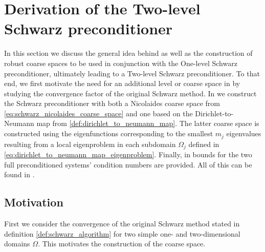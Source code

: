 \section{Derivation of the Two-level Schwarz preconditioner}\label{sec:schwarz_convergence}
In this section we discuss the general idea behind as well as the construction of robust coarse spaces to be used in conjunction with the One-level Schwarz preconditioner, ultimately leading to a Two-level Schwarz preconditioner. To that end, we first motivate the need for an additional level or coarse space in  by studying the convergence factor of the original Schwarz method. In  we construct the Schwarz preconditioner with both a Nicolaides coarse space from \cref{eq:schwarz_nicolaides_coarse_space} and one based on the Dirichlet-to-Neumann map from \cref{def:dirichlet_to_neumann_map}. The latter coarse space is constructed using the eigenfunctions corresponding to the smallest $m_j$ eigenvalues resulting from a local eigenproblem in each subdomain $\Omega_j$ defined in \cref{eq:dirichlet_to_neumann_map_eigenproblem}. Finally, in  bounds for the two full preconditioned systems' condition numbers are provided. All of this can be found in \cite[Sections 5.1-5.5]{schwarz_methods_Dolean_2015}.

\subsection{Motivation}\label{sec:schwarz_motivation}
First we consider the convergence of the original Schwarz method stated in definition \ref{def:schwarz_algorithm} for two simple one- and two-dimensional domains $\Omega$. This motivates the construction of the coarse space.

